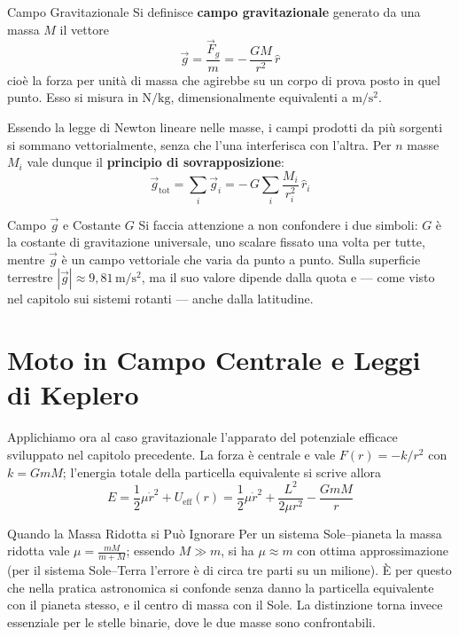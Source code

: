 \begin{definizione}{Campo Gravitazionale}
Si definisce \textbf{campo gravitazionale} generato da una massa $M$ il vettore
\begin{equation}
    \vec{g} = \frac{\vec{F}_g}{m} = - \, \frac{GM}{r^2} \, \hat{r}
\end{equation}
cioè la forza per unità di massa che agirebbe su un corpo di prova posto in quel punto. Esso si misura in $\mathrm{N/kg}$, dimensionalmente equivalenti a $\mathrm{m/s^2}$.
\end{definizione}

Essendo la legge di Newton lineare nelle masse, i campi prodotti da più sorgenti si sommano vettorialmente, senza che l'una interferisca con l'altra. Per $n$ masse $M_i$ vale dunque il \textbf{principio di sovrapposizione}:
\begin{equation}
    \vec{g}_{\text{tot}} = \sum_{i} \vec{g}_i = - \, G \sum_{i} \frac{M_i}{r_i^2} \, \hat{r}_i
\end{equation}

\begin{attenzione}{Campo $\vec{g}$ e Costante $G$}
Si faccia attenzione a non confondere i due simboli: $G$ è la costante di gravitazione universale, uno scalare fissato una volta per tutte, mentre $\vec{g}$ è un campo vettoriale che varia da punto a punto. Sulla superficie terrestre $|\vec{g}| \approx 9{,}81 \, \mathrm{m/s^2}$, ma il suo valore dipende dalla quota e --- come visto nel capitolo sui sistemi rotanti --- anche dalla latitudine.
\end{attenzione}

\section{Moto in Campo Centrale e Leggi di Keplero}

Applichiamo ora al caso gravitazionale l'apparato del potenziale efficace sviluppato nel capitolo precedente. La forza è centrale e vale $F(r) = -k/r^2$ con $k = GmM$; l'energia totale della particella equivalente si scrive allora
\begin{equation}
    E = \frac{1}{2} \mu \dot{r}^2 + U_{\text{eff}}(r)
      = \frac{1}{2} \mu \dot{r}^2 + \frac{L^2}{2\mu r^2} - \frac{GmM}{r}
\end{equation}

\begin{osservazione}{Quando la Massa Ridotta si Può Ignorare}
Per un sistema Sole--pianeta la massa ridotta vale $\mu = \frac{mM}{m+M}$; essendo $M \gg m$, si ha $\mu \approx m$ con ottima approssimazione (per il sistema Sole--Terra l'errore è di circa tre parti su un milione). È per questo che nella pratica astronomica si confonde senza danno la particella equivalente con il pianeta stesso, e il centro di massa con il Sole. La distinzione torna invece essenziale per le stelle binarie, dove le due masse sono confrontabili.
\end{osservazione}

